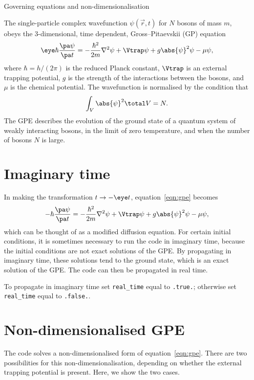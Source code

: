 \begin{chapter}{\label{cha:equations}Governing equations and
  non-dimensionalisation}

  The single-particle complex wavefunction $\psi(\vec{r}, t)$ for $N$ bosons of
  mass $m$, obeys the 3-dimensional, time dependent, Gross--Pitaevskii (GP)
  equation \citep{Gross61,Pitaevskii61}
  \begin{equation}
    \eye \hbar \frac{\pa \psi}{\pa t} = -\frac{\hbar^{2}}{2m} \nabla^{2} \psi +
    \Vtrap \psi + g \abs{\psi}^{2} \psi - \mu \psi,
    \label{eqn:gpe}
  \end{equation}
  where $\hbar = h/(2\pi)$ is the reduced Planck constant, $\Vtrap$ is an
  external trapping potential, $g$ is the strength of the interactions between
  the bosons, and $\mu$ is the chemical potential.  The wavefunction is
  normalised by the condition that
  \begin{equation*}
    \int_{V}{\abs{\psi}^{2}}\total V = N.
  \end{equation*}
  The GPE describes the evolution of the ground state of a quantum system of
  weakly interacting bosons, in the limit of zero temperature, and when the
  number of bosons $N$ is large.

  \section{Imaginary time}
  In making the transformation $t \to -\eye t$, equation~\eqref{eqn:gpe}
  becomes
  \begin{equation*}
    -\hbar \frac{\pa \psi}{\pa t} = -\frac{\hbar^{2}}{2m} \nabla^{2} \psi +
    \Vtrap \psi + g \abs{\psi}^{2} \psi - \mu \psi,
  \end{equation*}
  which can be thought of as a modified diffusion equation.  For certain
  initial conditions, it is sometimes necessary to run the code in imaginary
  time, because the initial conditions are not exact solutions of the GPE.  By
  propagating in imaginary time, these solutions tend to the ground state,
  which is an exact solution of the GPE.  The code can then be propagated in
  real time.

  To propagate in imaginary time set \verb"real_time" equal to \verb".true.";
  otherwise set \verb"real_time" equal to \verb".false.".

  \section{\label{sec:nondimgpe}Non-dimensionalised GPE}
  The code solves a non-dimensionalised form of equation~\eqref{eqn:gpe}.
  There are two possibilities for this non-dimensionalisation, depending on
  whether the external trapping potential is present.  Here, we show the two
  cases.


\end{chapter}
